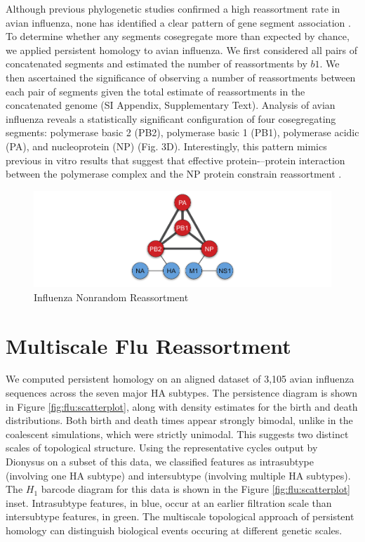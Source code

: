 Although previous phylogenetic studies confirmed a high reassortment rate in avian influenza, none has identified a clear pattern of gene segment association \cite{Dugan:2008iba}.
To determine whether any segments cosegregate more than expected by chance, we applied persistent homology to avian influenza.
We first considered all pairs of concatenated segments and estimated the number of reassortments by $b1$.
We then ascertained the significance of observing a number of reassortments between each pair of segments given the total estimate of reassortments in the concatenated genome (SI Appendix, Supplementary Text).
Analysis of avian influenza reveals a statistically significant configuration of four cosegregating segments: polymerase basic 2 (PB2), polymerase basic 1 (PB1), polymerase acidic (PA), and nucleoprotein (NP) (Fig. 3D).
Interestingly, this pattern mimics previous in vitro results that suggest that effective protein-–protein interaction between the polymerase complex and the NP protein constrain reassortment \cite{Lubeck:1979ws}.

\begin{figure}
\begin{center}
\centerline{\includegraphics[width=\columnwidth]{./fig/influenza/flu_reassortment_correlations.pdf}}
\caption[Influenza Nonrandom Reassortment]{Influenza Nonrandom Reassortment}
\label{fig:flu:nonrandom_reassortment}
\end{center}
\end{figure}

\section{Multiscale Flu Reassortment}
\label{flu:multiscale_reassortment}

We computed persistent homology on an aligned dataset of 3,105 avian influenza sequences across the seven major HA subtypes.
The persistence diagram is shown in Figure \ref{fig:flu:scatterplot}, along with density estimates for the birth and death distributions.
Both birth and death times appear strongly bimodal, unlike in the coalescent simulations, which were strictly unimodal.
This suggests two distinct scales of topological structure.
Using the representative cycles output by Dionysus on a subset of this data, we classified features as intrasubtype (involving one HA subtype) and intersubtype (involving multiple HA subtypes).
The $H_1$ barcode diagram for this data is shown in the Figure \ref{fig:flu:scatterplot} inset.
Intrasubtype features, in blue, occur at an earlier filtration scale than intersubtype features, in green.
The multiscale topological approach of persistent homology can distinguish biological events occuring at different genetic scales.

